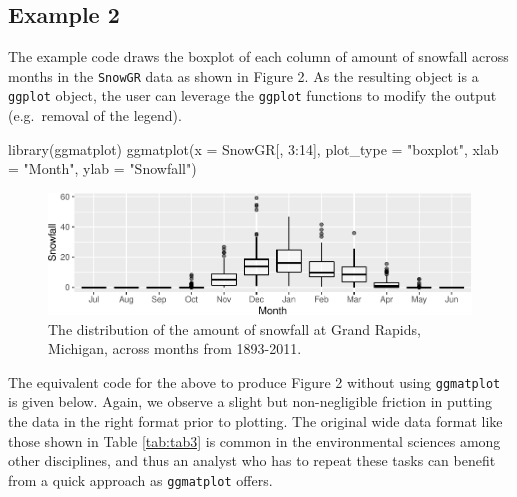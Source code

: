 \documentclass[10pt,a4paper,onecolumn]{article}
\newenvironment{Shaded}{\begin{snugshade}}{\end{snugshade}}
\newcommand{\AttributeTok}[1]{\textcolor[rgb]{0.77,0.63,0.00}{#1}}
\newcommand{\DecValTok}[1]{\textcolor[rgb]{0.00,0.00,0.81}{#1}}
\newcommand{\FunctionTok}[1]{\textcolor[rgb]{0.00,0.00,0.00}{#1}}
\newcommand{\NormalTok}[1]{#1}
\newcommand{\SpecialCharTok}[1]{\textcolor[rgb]{0.00,0.00,0.00}{#1}}
\newcommand{\StringTok}[1]{\textcolor[rgb]{0.31,0.60,0.02}{#1}}
\begin{document}
\hypertarget{example-2}{%
\subsection{Example 2}\label{example-2}}

The example code draws the boxplot of each column of amount of snowfall
across months in the \texttt{SnowGR} data as shown in Figure 2. As the
resulting object is a \texttt{ggplot} object, the user can leverage the
\texttt{ggplot} functions to modify the output (e.g.~removal of the
legend).

\begin{Shaded}
\begin{Highlighting}[]
\FunctionTok{library}\NormalTok{(ggmatplot)}
\FunctionTok{ggmatplot}\NormalTok{(}\AttributeTok{x =}\NormalTok{ SnowGR[, }\DecValTok{3}\SpecialCharTok{:}\DecValTok{14}\NormalTok{], }\AttributeTok{plot\_type =} \StringTok{"boxplot"}\NormalTok{,}
          \AttributeTok{xlab =} \StringTok{"Month"}\NormalTok{,  }\AttributeTok{ylab =} \StringTok{"Snowfall"}\NormalTok{)}
\end{Highlighting}
\end{Shaded}

\begin{figure}
\centering
\includegraphics{paper_files/figure-latex/matplot3-1.pdf}
\caption{The distribution of the amount of snowfall at Grand Rapids,
Michigan, across months from 1893-2011.}
\end{figure}

The equivalent code for the above to produce Figure 2 without using
\texttt{ggmatplot} is given below. Again, we observe a slight but
non-negligible friction in putting the data in the right format prior to
plotting. The original wide data format like those shown in Table
\ref{tab:tab3} is common in the environmental sciences among other
disciplines, and thus an analyst who has to repeat these tasks can
benefit from a quick approach as \texttt{ggmatplot} offers.
\end{document}
